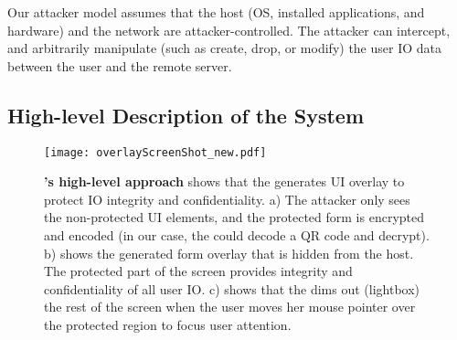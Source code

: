  Our attacker model assumes that the host (OS, installed applications, and hardware) and the network are attacker-controlled. The attacker can intercept, and arbitrarily manipulate (such as create, drop, or modify) the user IO data between the user and the remote server. 



\subsection{High-level Description of the System}

\begin{figure}[t]
\centering
\texttt{[image: overlayScreenShot\_new.pdf]}
\caption{\textbf{\name's high-level approach} shows that the \device generates UI overlay to protect IO integrity and confidentiality. a) The attacker only sees the non-protected UI elements, and the protected form is encrypted and encoded (in our case, the \device could decode a QR code and decrypt). b) shows the \device generated form overlay that is hidden from the host. The protected part of the screen provides integrity and confidentiality of all user IO. c) shows that the \device dims out (lightbox) the rest of the screen when the user moves her mouse pointer over the protected region to focus user attention.}
\spacesave
\label{fig:screenshot_1}
\end{figure}

